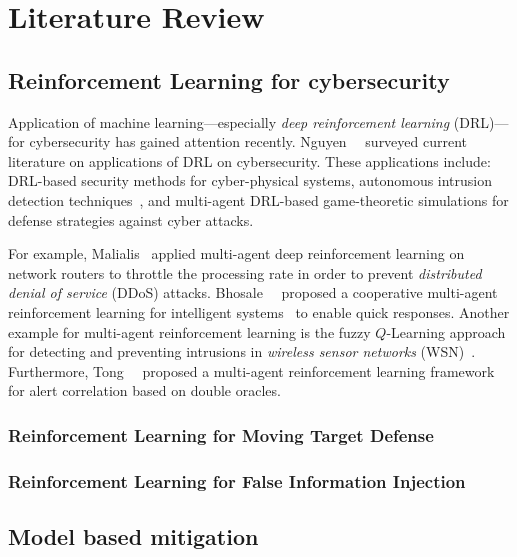 \chapter{Literature Review}
\label{chap:literature}


\section{Reinforcement Learning for cybersecurity}

Application of machine learning---especially \textit{deep reinforcement learning} (DRL)---for cybersecurity has gained attention recently. Nguyen~\ea~\cite{nguyen2019deep} surveyed current literature on applications of DRL on cybersecurity. These applications include: DRL-based security methods for cyber-physical systems, autonomous intrusion detection techniques~\cite{iannucci2019performance}, and multi-agent DRL-based game-theoretic simulations for defense strategies against cyber attacks.

For example, Malialis~\cite{malialis2015distributed,malialis2015distributed2} applied multi-agent deep reinforcement learning on network routers to throttle the processing rate in order to prevent \textit{distributed denial of service} (DDoS) attacks. Bhosale~\ea~\cite{bhosale2014cooperative} proposed a cooperative multi-agent reinforcement learning for intelligent systems~\cite{herrero2009multiagent} to enable quick responses. Another example for multi-agent reinforcement learning is the fuzzy $Q$-Learning approach for detecting and preventing intrusions in \textit{wireless sensor networks} (WSN)~\cite{shamshirband2014cooperative}. Furthermore, Tong~\ea~\cite{tong2019finding} proposed a multi-agent reinforcement learning framework for alert correlation based on double oracles.

\subsection{Reinforcement Learning for Moving Target Defense}

\subsection{Reinforcement Learning for False Information Injection}

\section{Model based mitigation}

